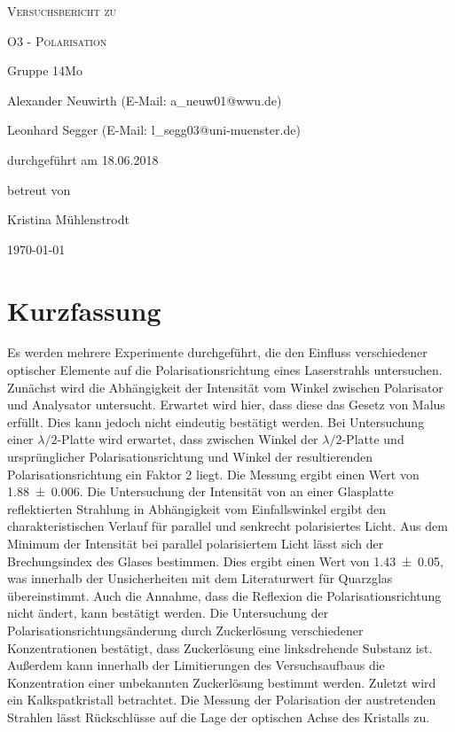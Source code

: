 \documentclass[
	a4paper,
	12pt,
	pagesize,
	ngerman
]{scrartcl}
\begin{document}
	
	\begin{titlepage}
		\centering
		{\scshape\LARGE Versuchsbericht zu \par}
		\vspace{1cm}
		{\scshape\huge O3 - Polarisation \par}
		\vspace{2.5cm}
		{\LARGE Gruppe 14Mo \par}
		\vspace{0.5cm}
		
		{\large Alexander Neuwirth (E-Mail: a\_neuw01@wwu.de) \par}
		{\large Leonhard Segger (E-Mail: l\_segg03@uni-muenster.de) \par}
		\vfill
		
		durchgeführt am 18.06.2018\par
		betreut von\par
		{\large Kristina Mühlenstrodt}
		
		\vfill
		
		{\large \today\par}
	\end{titlepage}
	\tableofcontents
	\newpage


	\section{Kurzfassung}
	Es werden mehrere Experimente durchgeführt, die den Einfluss verschiedener optischer Elemente auf die Polarisationsrichtung eines Laserstrahls untersuchen.
	Zunächst wird die Abhängigkeit der Intensität vom Winkel zwischen Polarisator und Analysator untersucht.
	Erwartet wird hier, dass diese das Gesetz von Malus erfüllt.
	Dies kann jedoch nicht eindeutig bestätigt werden.
	Bei Untersuchung einer $\lambda /2$-Platte wird erwartet, dass zwischen Winkel der  $\lambda /2$-Platte und ursprünglicher Polarisationsrichtung und Winkel der resultierenden Polarisationsrichtung ein Faktor 2 liegt.
	Die Messung ergibt einen Wert von \SI{1,88\pm 0,006}{}.
	Die Untersuchung der Intensität von an einer Glasplatte reflektierten Strahlung in Abhängigkeit vom Einfallswinkel ergibt den charakteristischen Verlauf für parallel und senkrecht polarisiertes Licht.
	Aus dem Minimum der Intensität bei parallel polarisiertem Licht lässt sich der Brechungsindex des Glases bestimmen.
	Dies ergibt einen Wert von \SI{1,43 \pm 0,05}{}, was innerhalb der Unsicherheiten mit dem Literaturwert für Quarzglas übereinstimmt.
	Auch die Annahme, dass die Reflexion die Polarisationsrichtung nicht ändert, kann bestätigt werden.
	Die Untersuchung der Polarisationsrichtungsänderung durch Zuckerlösung verschiedener Konzentrationen bestätigt, dass Zuckerlösung eine linksdrehende Substanz ist.
	Außerdem kann innerhalb der Limitierungen des Versuchsaufbaus die Konzentration einer unbekannten Zuckerlösung bestimmt werden.
	Zuletzt wird ein Kalkspatkristall betrachtet.
	Die Messung der Polarisation der austretenden Strahlen lässt Rückschlüsse auf die Lage der optischen Achse des Kristalls zu.
\end{document}
